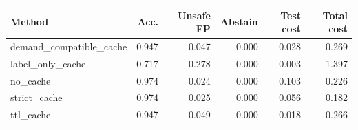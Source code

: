 \begin{tabular}{lrrrrr}
\toprule
Method & Acc. & Unsafe FP & Abstain & Test cost & Total cost \\
\midrule
demand\_compatible\_cache & 0.947 & 0.047 & 0.000 & 0.028 & 0.269 \\
label\_only\_cache & 0.717 & 0.278 & 0.000 & 0.003 & 1.397 \\
no\_cache & 0.974 & 0.024 & 0.000 & 0.103 & 0.226 \\
strict\_cache & 0.974 & 0.025 & 0.000 & 0.056 & 0.182 \\
ttl\_cache & 0.947 & 0.049 & 0.000 & 0.018 & 0.266 \\
\bottomrule
\end{tabular}
